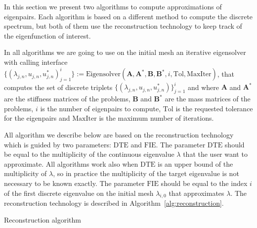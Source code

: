 \documentclass[smallextended]{svjour3}
\begin{document}
In this section we present two algorithms to compute approximations of eigenpairs. Each algorithm is based on a different method to compute the discrete spectrum, but both of them use the reconstruction technology to keep track of the eigenfunction of interest.

In all algorithms we are going to use on the initial mesh an iterative eigensolver with calling interface
$\{(\lambda_{j,n},u_{j,n},u_{j,n}^*)_{j=1}^{i}\}:=\mathrm{Eigensolver}(\mathbf{A},
\mathbf{A}^*,\mathbf{B},\mathbf{B}^*,i,\mathrm{Tol},\mathrm{MaxIter})$, that computes the set of discrete triplets $\{(\lambda_{j,n},u_{j,n},u_{j,n}^*)\}_{j=1}^{i}$ and where $\mathbf{A}$ and $\mathbf{A}^*$ are the stiffness matrices of the problems, $\mathbf{B}$ and $\mathbf{B}^*$ are the mass matrices of the problems, $i$ is the number of eigenpairs to compute, $\mathrm{Tol}$ is the requested tolerance for the eigenpairs and $\mathrm{MaxIter}$ is the maximum number of iterations. 


All algorithm we describe below are based on the reconstruction technology which is guided by two parameters: $\mathrm{DTE}$ and $\mathrm{FIE}$. The parameter $\mathrm{DTE}$ should be equal to the multiplicity of the continuous eigenvalue $\lambda$ that the user want to approximate. All algorithms work also when $\mathrm{DTE}$ is an upper bound of the multiplicity of $\lambda$, so in practice the multiplicity of the target eigenvalue is not necessary to be known exactly. The parameter $\mathrm{FIE}$ should be equal to the index $i$ of the first discrete eigenvalue on the initial mesh $\lambda_{i,0}$ that approximates $\lambda$. The reconstruction technology is described in Algorithm~\eqref{alg:reconstruction}.

\begin{algorithm}[!ht] \caption{Reconstruction algorithm} \label{alg:reconstruction} 
\begin{algorithmic}





\end{algorithmic}
\end{algorithm}
\end{document}
